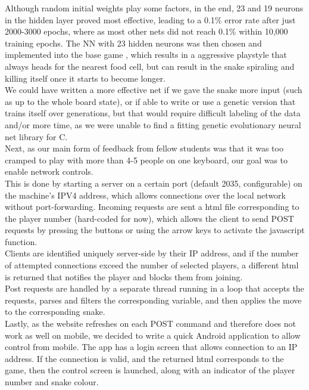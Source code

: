 \documentclass{article}
\begin{document}
Although random initial weights play some factors, in the end, 23 and 19 neurons in the hidden layer proved most effective, leading to a 0.1\% error rate after just 2000-3000 epochs, where as most other nets did not reach 0.1\% within 10,000 training epochs. The NN with 23 hidden neurons was then chosen and implemented into the base game , which results in a aggressive playstyle that always heads for the nearest food cell, but can result in the snake spiraling and killing itself once it starts to become longer.\\

We could have written a more effective net if we gave the snake more input (such as up to the whole board state), or if able to write or use a genetic version that trains itself over generations, but that would require difficult labeling of the data and/or more time, as we were unable to find a fitting genetic evolutionary neural net library for C.\\

Next, as our main form of feedback from fellow students was that it was too cramped to play with more than 4-5 people on one keyboard, our goal was to enable network controls.\\

This is done by starting a server on a certain port (default 2035, configurable) on the machine's IPV4 address, which allows connections over the local network without port-forwarding. Incoming requests are sent a html file corresponding to the player number (hard-coded for now), which allows the client to send POST requests by pressing the buttons or using the arrow keys to activate the javascript function.\\

Clients are identified uniquely server-side by their IP address, and if the number of attempted connections exceed the number of selected players, a different html is returned that notifies the player and blocks them from joining.\\

Post requests are handled by a separate thread running in a loop that accepts the requests, parses and filters the corresponding variable, and then applies the move to the corresponding snake.\\

Lastly, as the website refreshes on each POST command and therefore does not work as well on mobile, we decided to write a quick Android application to allow control from mobile. The app has a login screen that allows connection to an IP address. If the connection is valid, and the returned html corresponds to the game, then the control screen is launched, along with an indicator of the player number and snake colour.\\
\end{document}
